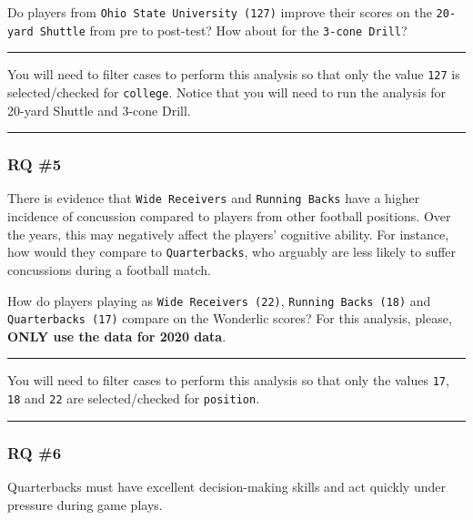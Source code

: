\documentclass[
]{article}
\begin{document}
Do players from \texttt{Ohio\ State\ University\ (127)} improve their scores on the \texttt{20-yard\ Shuttle} from pre to post-test? How about for the \texttt{3-cone\ Drill}?

\begin{center}\rule{0.5\linewidth}{0.5pt}\end{center}

You will need to filter cases to perform this analysis so that only the value \texttt{127} is selected/checked for \texttt{college}. Notice that you will need to run the analysis for 20-yard Shuttle and 3-cone Drill.

\begin{center}\rule{0.5\linewidth}{0.5pt}\end{center}

\hypertarget{rq-5}{%
\subsubsection{RQ \#5}\label{rq-5}}

There is evidence that \texttt{Wide\ Receivers} and \texttt{Running\ Backs} have a higher incidence of concussion compared to players from other football positions. Over the years, this may negatively affect the players' cognitive ability. For instance, how would they compare to \texttt{Quarterbacks}, who arguably are less likely to suffer concussions during a football match.

How do players playing as \texttt{Wide\ Receivers\ (22)}, \texttt{Running\ Backs\ (18)} and \texttt{Quarterbacks\ (17)} compare on the Wonderlic scores? For this analysis, please, \textbf{ONLY use the data for 2020 data}.

\begin{center}\rule{0.5\linewidth}{0.5pt}\end{center}

You will need to filter cases to perform this analysis so that only the values \texttt{17}, \texttt{18} and \texttt{22} are selected/checked for \texttt{position}.

\begin{center}\rule{0.5\linewidth}{0.5pt}\end{center}

\hypertarget{rq-6}{%
\subsubsection{RQ \#6}\label{rq-6}}

Quarterbacks must have excellent decision-making skills and act quickly under pressure during game plays.
\end{document}
